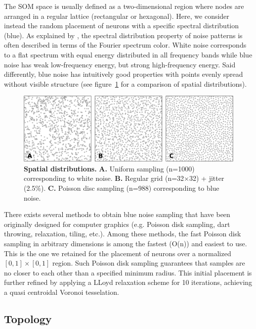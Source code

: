 The SOM space is usually defined as a two-dimensional region where nodes are
arranged in a regular lattice (rectangular or hexagonal). Here, we consider
instead the random placement of neurons with a specific spectral distribution
(blue). As explained by \citet{Zhou:2012}, the spectral distribution
property of noise patterns is often described in terms of the Fourier spectrum
color. White noise corresponds to a flat spectrum with equal energy distributed
in all frequency bands while blue noise has weak low-frequency energy, but
strong high-frequency energy. Said differently, blue noise has intuitively
good properties with points evenly spread without visible structure (see
figure~\ref{fig:sampling} for a comparison of spatial distributions).
\begin{figure}[htbp]
  \includegraphics[width=\textwidth]{figures/blue-noise.pdf}
  \caption{\textbf{Spatial distributions.}
    \textbf{\textsf{A.}} Uniform sampling (n=1000) corresponding to white noise.
    \textbf{\textsf{B.}} Regular grid (n=32$\times$32) + jitter (2.5\%).
    \textbf{\textsf{C.}} Poisson disc sampling (n=988) corresponding to blue noise.}
  \label{fig:sampling}
\end{figure}
There exists several methods \citep{Lagae:2008} to obtain blue noise
sampling that have been originally designed for computer graphics (e.g. Poisson
disk sampling, dart throwing, relaxation, tiling, etc.). Among these methods,
the fast Poisson disk sampling in arbitrary dimensions \citep{Bridson:2007}
is among the fastest (O(n)) and easiest to use. This is the one we retained for
the placement of neurons over a normalized $[0,1]\times[0,1]$ region. Such
Poisson disk sampling guarantees that samples are no closer to each other than
a specified minimum radius. This initial placement is further refined by
applying a LLoyd relaxation \citep{Lloyd:1982} scheme for 10 iterations,
achieving a quasi centroidal Voronoi tesselation.

\subsection{Topology}


